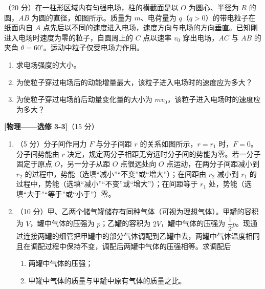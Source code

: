 \begin{question}
（20 分）在一柱形区域内有匀强电场，柱的横截面是以 $O$ 为圆心、半径为 $R$ 的圆，$AB$ 为圆的直径，如图所示。质量为 $m$、电荷量为 $q$（$q>0$）的带电粒子在纸面内自 $A$ 点先后以不同的速度进入电场，速度方向与电场的方向垂直。已知刚进入电场时速度为零的粒子，自圆周上的 $C$ 点以速率 $v_0$ 穿出电场，$AC$ 与 $AB$ 的夹角 $\theta=60^{\circ}$。运动中粒子仅受电场力作用。


\begin{enumerate}[leftmargin=2em, label=(\arabic*)]
  \item 求电场强度的大小。
  \item 为使粒子穿过电场后的动能增量最大，该粒子进入电场时的速度应为多大？
  \item 为使粒子穿过电场前后动量变化量的大小为 $mv_0$，该粒子进入电场时的速度应为多大？
\end{enumerate}
\end{question}

\clearpage
{}

\begin{question}
\textbf{[物理——选修 3-3]}（15 分）\nopagebreak[4]

\begin{enumerate}[leftmargin=2em, label=(\arabic*)]
  \item （5 分）分子间作用力 $F$ 与分子间距 $r$ 的关系如图所示，$r=r_1$ 时，$F=0$。分子间势能由 $r$ 决定，规定两分子相距无穷远时分子间的势能为零。若一分子固定于原点 $O$，另一分子从距 $O$ 点很远处向 $O$ 点运动，在两分子间距减小到 $r_2$ 的过程中，势能\gkblank（选填“减小”“不变”或“增大”）；在间距由 $r_2$ 减小到 $r_1$ 的过程中，势能\gkblank（选填“减小”“不变”或“增大”）；在间距等于 $r_1$ 处，势能\gkblank（选填“大于”“等于”或“小于”）零。


  \item （10 分）甲、乙两个储气罐储存有同种气体（可视为理想气体）。甲罐的容积为 $V$，罐中气体的压强为 $p$；乙罐的容积为 $2V$，罐中气体的压强为 $\dfrac{1}{2}p$。现通过连接两罐的细管把甲罐中的部分气体调配到乙罐中去，两罐中气体温度相同且在调配过程中保持不变，调配后两罐中气体的压强相等。求调配后
  \begin{enumerate}[leftmargin=1.5em, label=（\roman*）]
    \item 两罐中气体的压强；
    \item 甲罐中气体的质量与甲罐中原有气体的质量之比。
  \end{enumerate}
\end{enumerate}
\end{question}

